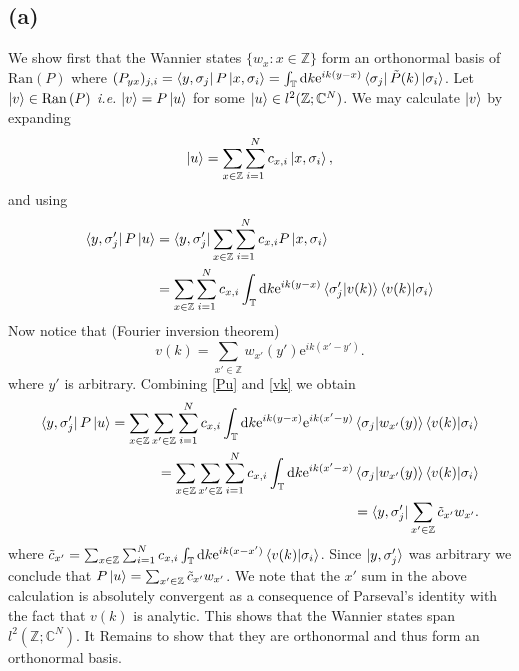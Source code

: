 \documentclass[a4paper,11pt]{article}
\newcommand{\euler}[1]{\text{e}^{#1}}
\newcommand{\Ran}[1]{\text{Ran}\left(#1\right)}
\newcommand*\diff{\mathop{}\!\mathrm{d}}
\newcommand{\ie}{\emph{i.e.} }
\newcommand{\C}{\mathbb{C}}
\newcommand{\Z}{\mathbb{Z}}
\numberwithin{equation}{section}
\begin{document}
 	 \subsection*{(a)} We show first that the Wannier states $ \{w_x : x\in\Z \}$ form an orthonormal basis of $ \Ran{P} $ where $ (P_{yx})_{j,i}=\bra{y,\sigma_j}P\ket{x,\sigma_i}=\int_\mathbb{T} \diff k \euler{ik(y-x)}\bra{\sigma_j}\tilde{P}(k)\ket{\sigma_i}$. Let $ \ket{v}\in\Ran{P} $ \ie $ \ket{v}=P\ket{u} $ for some $ \ket{u}\in l^2(\Z;\C^N) $. We may calculate $\ket{v}$ by expanding\begin{equation}
 	 \ket{u}=\sum_{x\in\Z}\sum_{i=1}^{N}c_{x,i}\ket{x,\sigma_i},
 	 \end{equation} 
 	 and using\begin{equation}
 	 \begin{aligned}
 	 \bra{y,\sigma_j'}P\ket{u}&=\bra{y,\sigma_j'}\sum_{x\in\Z}\sum_{i=1}^{N}c_{x,i}P\ket{x,\sigma_i}\\&=\sum_{x\in\Z}\sum_{i=1}^{N}c_{x,i}\int_\mathbb{T}\diff k \euler{ik(y-x)}\braket{\sigma_j'|v(k)}\braket{v(k)|\sigma_i}\label{Pu}
 	 \end{aligned}
 	 \end{equation}
 	 Now notice that (Fourier inversion theorem) \begin{equation}
 	 v(k)=\sum_{x'\in\Z}w_{x'}(y')\euler{ik(x'-y')}. \label{vk}
 	 \end{equation}
 	 where $ y' $ is arbitrary.
 	 Combining \eqref{Pu} and \eqref{vk} we obtain\begin{equation}
 	 \begin{aligned}
 	 \bra{y,\sigma_j'}P\ket{u}=\sum_{x\in\Z}\sum_{x'\in\Z}\sum_{i=1}^{N}c_{x,i}\int_\mathbb{T}\diff k \euler{ik(y-x)}\euler{ik(x'-y)}\braket{\sigma_j|w_{x'}(y)}\braket{v(k)|\sigma_i}\\
 	 =\sum_{x\in\Z}\sum_{x'\in\Z}\sum_{i=1}^{N}c_{x,i}\int_\mathbb{T}\diff k \euler{ik(x'-x)}\braket{\sigma_j|w_{x'}(y)}\braket{v(k)|\sigma_i}\\
 	 =\bra{y,\sigma_j'}\sum_{x'\in\Z} \tilde{c}_{x'}w_{x'}.
 	 \end{aligned}
 	 \end{equation}
 	 where $ \tilde{c}_{x'}=\sum_{x\in\Z}\sum_{i=1}^{N}c_{x,i}\int_{\mathbb{T}}\diff k \euler{ik(x-x')}\braket{v(k)|\sigma_i}$. Since $ \ket{y,\sigma_j'} $ was arbitrary we conclude that $ P\ket{u}=\sum_{x'\in\Z} \tilde{c}_{x'}w_{x'} $. We note that the $ x' $ sum in the above calculation is absolutely convergent as a consequence of Parseval's identity with the fact that $ v(k) $ is analytic. This shows that the Wannier states span $ l^2(\Z;\C^N) $. It Remains to show that they are orthonormal and thus form an orthonormal basis.\\
\end{document}
